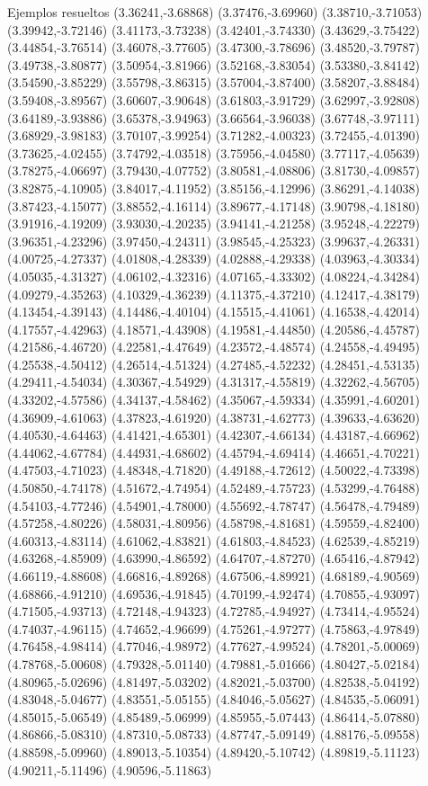 \documentclass[11pt,a4paper]{article}
\begin{document}
\begin{fmex}{Ejemplos resueltos}
(3.36241,-3.68868) (3.37476,-3.69960) (3.38710,-3.71053) (3.39942,-3.72146) (3.41173,-3.73238) (3.42401,-3.74330) (3.43629,-3.75422) (3.44854,-3.76514) (3.46078,-3.77605) (3.47300,-3.78696) (3.48520,-3.79787) (3.49738,-3.80877) (3.50954,-3.81966) (3.52168,-3.83054) (3.53380,-3.84142) (3.54590,-3.85229) (3.55798,-3.86315) (3.57004,-3.87400) (3.58207,-3.88484) (3.59408,-3.89567) (3.60607,-3.90648) (3.61803,-3.91729) (3.62997,-3.92808) (3.64189,-3.93886) (3.65378,-3.94963) (3.66564,-3.96038) (3.67748,-3.97111) (3.68929,-3.98183) (3.70107,-3.99254) (3.71282,-4.00323) (3.72455,-4.01390) (3.73625,-4.02455) (3.74792,-4.03518) (3.75956,-4.04580) (3.77117,-4.05639) (3.78275,-4.06697) (3.79430,-4.07752) (3.80581,-4.08806) (3.81730,-4.09857) (3.82875,-4.10905) (3.84017,-4.11952) (3.85156,-4.12996) (3.86291,-4.14038) (3.87423,-4.15077) (3.88552,-4.16114) (3.89677,-4.17148) (3.90798,-4.18180) (3.91916,-4.19209) (3.93030,-4.20235) (3.94141,-4.21258) (3.95248,-4.22279) (3.96351,-4.23296) (3.97450,-4.24311) (3.98545,-4.25323) (3.99637,-4.26331) (4.00725,-4.27337) (4.01808,-4.28339) (4.02888,-4.29338) (4.03963,-4.30334) (4.05035,-4.31327) (4.06102,-4.32316) (4.07165,-4.33302) (4.08224,-4.34284) (4.09279,-4.35263) (4.10329,-4.36239) (4.11375,-4.37210) (4.12417,-4.38179) (4.13454,-4.39143) (4.14486,-4.40104) (4.15515,-4.41061) (4.16538,-4.42014) (4.17557,-4.42963) (4.18571,-4.43908) (4.19581,-4.44850) (4.20586,-4.45787) (4.21586,-4.46720) (4.22581,-4.47649) (4.23572,-4.48574) (4.24558,-4.49495) (4.25538,-4.50412) (4.26514,-4.51324) (4.27485,-4.52232) (4.28451,-4.53135) (4.29411,-4.54034) (4.30367,-4.54929) (4.31317,-4.55819) (4.32262,-4.56705) (4.33202,-4.57586) (4.34137,-4.58462) (4.35067,-4.59334) (4.35991,-4.60201) (4.36909,-4.61063) (4.37823,-4.61920) (4.38731,-4.62773) (4.39633,-4.63620) (4.40530,-4.64463) (4.41421,-4.65301) (4.42307,-4.66134) (4.43187,-4.66962) (4.44062,-4.67784) (4.44931,-4.68602) (4.45794,-4.69414) (4.46651,-4.70221) (4.47503,-4.71023) (4.48348,-4.71820) (4.49188,-4.72612) (4.50022,-4.73398) (4.50850,-4.74178) (4.51672,-4.74954) (4.52489,-4.75723) (4.53299,-4.76488) (4.54103,-4.77246) (4.54901,-4.78000) (4.55692,-4.78747) (4.56478,-4.79489) (4.57258,-4.80226) (4.58031,-4.80956) (4.58798,-4.81681) (4.59559,-4.82400) (4.60313,-4.83114) (4.61062,-4.83821) (4.61803,-4.84523) (4.62539,-4.85219) (4.63268,-4.85909) (4.63990,-4.86592) (4.64707,-4.87270) (4.65416,-4.87942) (4.66119,-4.88608) (4.66816,-4.89268) (4.67506,-4.89921) (4.68189,-4.90569) (4.68866,-4.91210) (4.69536,-4.91845) (4.70199,-4.92474) (4.70855,-4.93097) (4.71505,-4.93713) (4.72148,-4.94323) (4.72785,-4.94927) (4.73414,-4.95524) (4.74037,-4.96115) (4.74652,-4.96699) (4.75261,-4.97277) (4.75863,-4.97849) (4.76458,-4.98414) (4.77046,-4.98972) (4.77627,-4.99524) (4.78201,-5.00069) (4.78768,-5.00608) (4.79328,-5.01140) (4.79881,-5.01666) (4.80427,-5.02184) (4.80965,-5.02696) (4.81497,-5.03202) (4.82021,-5.03700) (4.82538,-5.04192) (4.83048,-5.04677) (4.83551,-5.05155) (4.84046,-5.05627) (4.84535,-5.06091) (4.85015,-5.06549) (4.85489,-5.06999) (4.85955,-5.07443) (4.86414,-5.07880) (4.86866,-5.08310) (4.87310,-5.08733) (4.87747,-5.09149) (4.88176,-5.09558) (4.88598,-5.09960) (4.89013,-5.10354) (4.89420,-5.10742) (4.89819,-5.11123) (4.90211,-5.11496) (4.90596,-5.11863) 
\end{fmex}
\end{document}

